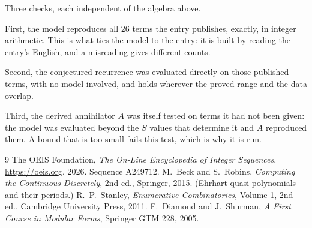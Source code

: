 \documentclass[11pt,a4paper]{article}
\theoremstyle{plain}
\theoremstyle{definition}
\begin{document}
Three checks, each independent of the algebra above.

First, the model reproduces all $26$ terms the entry publishes, exactly, in integer
arithmetic. This is what ties the model to the entry: it is built by reading the entry's
English, and a misreading gives different counts.

Second, the conjectured recurrence was evaluated directly on those published terms, with no
model involved, and holds wherever the proved range and the data overlap.

Third, the derived annihilator $A$ was itself tested on terms it had not been given: the model
was evaluated beyond the $S$ values that determine it and $A$ reproduced them. A bound that is
too small fails this test, which is why it is run.

\begin{thebibliography}{9}
 The OEIS Foundation, \emph{The On-Line Encyclopedia of Integer
Sequences}, \url{https://oeis.org}, 2026. Sequence A249712.
 M.~Beck and S.~Robins, \emph{Computing the Continuous Discretely},
2nd ed., Springer, 2015. (Ehrhart quasi-polynomials and their periods.)
 R.~P.~Stanley, \emph{Enumerative Combinatorics}, Volume 1, 2nd ed.,
Cambridge University Press, 2011.
 F.~Diamond and J.~Shurman, \emph{A First Course in Modular Forms},
Springer GTM 228, 2005.
\end{thebibliography}
\end{document}
